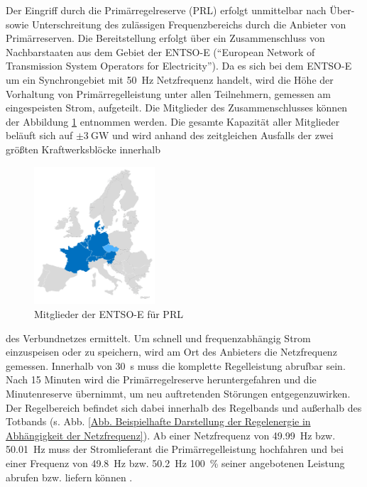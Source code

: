 			Der Eingriff durch die Primärregelreserve (PRL) erfolgt unmittelbar nach Über- sowie Unterschreitung des zulässigen Frequenzbereichs durch die Anbieter von Primärreserven.
			Die Bereitstellung erfolgt über ein Zusammenschluss von Nachbarstaaten aus dem Gebiet der ENTSO-E ("`European Network of Transmission System Operators for Electricity"').
			Da es sich bei dem ENTSO-E um ein Synchrongebiet mit \SI{50}{\hertz} Netzfrequenz handelt, wird die Höhe der Vorhaltung von Primärregelleistung unter allen Teilnehmern, gemessen am eingespeisten Strom, aufgeteilt.
			Die Mitglieder des Zusammenschlusses können der Abbildung \ref{Abb. Mitglieder ENTSO-E} entnommen werden. 
			Die gesamte Kapazität aller Mitglieder beläuft sich auf $\pm\SI{3}{\giga\watt}$ und wird anhand des zeitgleichen Ausfalls der zwei größten Kraftwerksblöcke innerhalb\begin{figure}
				\centering
				\includegraphics[page=1,trim=70 70 70 120, clip, width=0.4\textwidth]{./anhang/frc-map.png}
				\caption{Mitglieder der ENTSO-E für PRL \cite{ENTSO-E_PRL}}
				\label{Abb. Mitglieder ENTSO-E}
			\end{figure} des Verbundnetzes ermittelt.
			Um schnell und frequenzabhängig Strom einzuspeisen oder zu speichern, wird am Ort des Anbieters die Netzfrequenz gemessen. 
			Innerhalb von \SI{30}{\second} muss die komplette Regelleistung abrufbar sein.
			Nach \num{15} Minuten wird die Primärregelreserve heruntergefahren und die Minutenreserve übernimmt, um neu auftretenden Störungen entgegenzuwirken.
			Der Regelbereich befindet sich dabei innerhalb des Regelbands und außerhalb des Totbands (s. Abb. \ref{Abb. Beispielhafte Darstellung der Regelenergie in Abhängigkeit der Netzfrequenz}).
			Ab einer Netzfrequenz von \SI{49,99}{\hertz} bzw. \SI{50,01}{\hertz} muss der Stromlieferant die Primärregelleistung hochfahren und bei einer Frequenz von \SI{49,8}{\hertz} bzw. \SI{50,2}{\hertz} \SI{100}{\percent} seiner angebotenen Leistung abrufen bzw. liefern können \cite{Primäreserve_NextKraftwerke}. 
			
